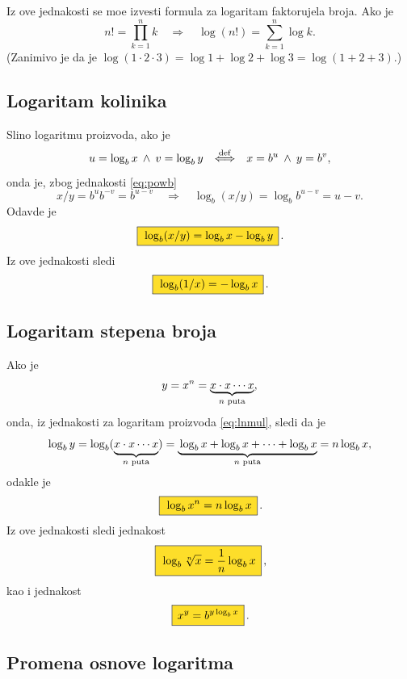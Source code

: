 \documentclass[12pt, twoside, a4paper]{article}
\def\land{\mathbin{\>\wedge\>}}
\def\logb{\log_b}
\def\okvir#1{\,\fcolorbox{black}{Goldenrod}{$\,\displaystyle{\mathstrut #1}\,$}\,}
\def\sledi{{\quad\Rightarrow\quad}}
\def\podef{{\quad\buildrel\rm def\over\Longleftrightarrow\quad}}
\begin{document}
Iz ove jednakosti se mo{\zv}e izvesti formula za logaritam faktorujela broja. Ako je
$$
n!=\prod_{k=1}^n k\sledi \log(n!)=\sum_{k=1}^n\log k.
$$
(Zanim{\lj}ivo je da je $\log(1\cdot2\cdot3)=\log1+\log2+\log3=\log(1+2+3)$.)


\subsection{Logaritam koli{\cv}nika}

Sli{\cv}no logaritmu proizvoda, 
ako je
$$
u=\logb x\land v=\log_b y \podef x=b^u\land y=b^v,
$$
onda je, zbog jednakosti \eqref{eq:powb}
$$
x/ y=b^ub^{-v}=b^{u-v}\sledi \logb(x/y)=\logb b^{u-v}=u-v.
$$
Odavde je
\begin{equation}
\okvir{\logb(x/ y)=\logb x-\logb y}.
\label{eq:lndiv}
\end{equation}
Iz ove jednakosti sledi
\begin{equation}
\okvir{\logb(1/x)=-\logb x}.
\label{eq:recip}
\end{equation}

\subsection{Logaritam stepena broja}

Ako je
$$
y=x^n=\underbrace{x\cdot x\cdots x}_{\text{$\mathstrut n$ puta}},
$$
onda, iz jednakosti za logaritam proizvoda \eqref{eq:lnmul}, sledi da je
$$
\logb y=\logb (\underbrace{\mathstrut x\cdot x\cdots x}_{\text{$n$ puta}})
=\underbrace{\mathstrut \logb x+\logb x+\cdots+\logb x}_{\text{$n$ puta}}
=n\logb x,
$$
odakle je
\begin{equation}
\okvir{\logb x^n=n\logb x}.
\label{eq:bpow}
\end{equation}
Iz ove jednakosti sledi jednakost
\begin{equation}
\okvir{\logb\sqrt[n] x=\frac1n\logb x},
\label{eq:lnroot}
\end{equation}
kao i jednakost
\begin{equation}
\okvir{x^y=b^{y\logb x}}.
\label{eq:power}
\end{equation}


\subsection{Promena osnove logaritma}
\end{document}
